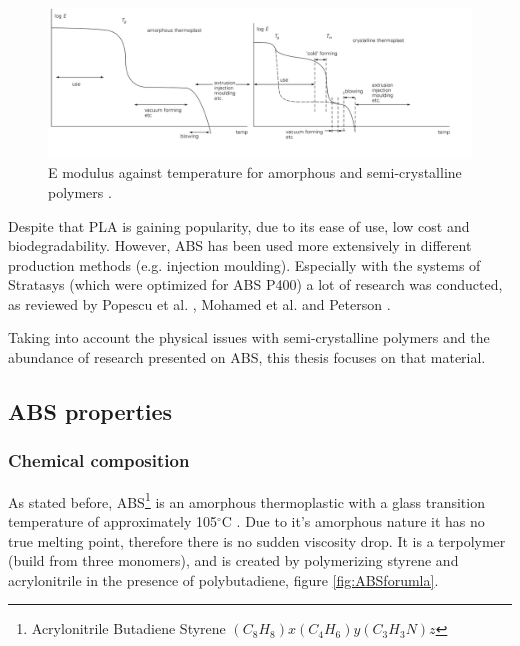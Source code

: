\begin{figure}[htb]
    \centering
    \includegraphics[width=1\textwidth]{chapter_2/figures/EvsT.PNG}
    \caption{E modulus against temperature for amorphous and semi-crystalline polymers \cite{Van_der_Vegt2001FromPlastics}.}
    \label{fig:EvsT}
\end{figure}

Despite that PLA is gaining popularity, due to its ease of use, low cost and biodegradability. However, ABS has been used more extensively in different production methods (e.g. injection moulding). Especially with the systems of Stratasys (which were optimized for ABS P400) a lot of research was conducted, as reviewed by Popescu et al. \cite{Popescu2018FDMReview}, Mohamed et al. \cite{Mohamed2015OptimizationProspects} and Peterson \cite{Peterson2019ReviewPerspective}.  

Taking into account the physical issues with semi-crystalline polymers and the abundance of research presented on ABS, this thesis focuses on that material.

\subsection{ABS properties}
    \label{ABS properties}
 \subsubsection{Chemical composition}
As stated before, ABS\footnote{Acrylonitrile Butadiene Styrene $(C_8H_8)x (C_4H_6)y (C_3H_3N)z$} is an amorphous thermoplastic with a glass transition temperature of approximately 105$^{\circ}$C \cite{Peterson2019ReviewPerspective}. Due to it's amorphous nature it has no true melting point, therefore there is no sudden viscosity drop. It is a terpolymer (build from three monomers), and is created by polymerizing styrene and acrylonitrile in the presence of polybutadiene, figure \ref{fig:ABSforumla}.

